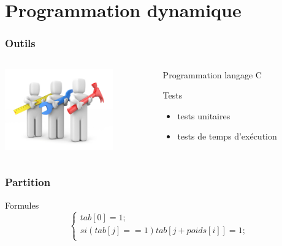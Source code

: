\documentclass[french]{beamer}
\begin{document}
\section{Programmation dynamique}

\begin{frame}
  \frametitle{Outils}
  \begin{columns}
    \begin{column}[]{5cm}
      \begin{center}
        \includegraphics[height=3.5cm]{tools.jpeg}
      \end{center}
    \end{column}
      \begin{column}[]{5cm}
         \begin{block}{Programmation}
        langage C
      \end{block}
      \begin{block}{Tests}
        \begin{itemize}
        \item tests unitaires
        \item tests de temps d'exécution
        \end{itemize}
      \end{block}
      \end{column}
    \end{columns}
  \end{frame}

\begin{frame}
  \frametitle{Partition}
  \begin{alertblock}{Formules}
    \begin{equation}
      \begin{cases}
        tab[0] = 1; \\
        si ( tab[j] == 1 ) {
          tab[j + poids[i]] = 1;
        } \\
      \end{cases}
    \end{equation}
  \end{alertblock}
\end{frame}
\end{document}
